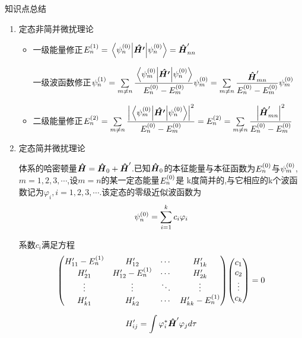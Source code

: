 \documentclass{article}
\begin{document}
        \begin{formal}
            知识点总结  
            \begin{enumerate}
                \item 定态非简并微扰理论
                \begin{itemize}
                    \item 一级能量修正$ \pe{n}{1} = \ev{\vu*{H'}}{\pp{n}{0}} = \vu*{H}'_{nn} \quad $
                    
                    一级波函数修正$ 
                    \psi_{n}^{(1)} = \sum\limits_{m \neq n} \dfrac{\mel{\psi_{m}^{(0)}}{\vu*{H'}}{\psi_{n}^{(0)}}}{E_{n}^{(0)} - E_{m}^{(0)} } \psi_{m}^{(0)} =  
                    \sum\limits_{m \neq n} \dfrac{\vu*{H}'_{mn}}{E_{n}^{(0)} - E_{m}^{(0)} } \psi_{m}^{(0)}
                    $
                    
                    \item 二级能量修正$ 
                    E_{n}^{(2)} = \sum\limits_{m \neq n} \dfrac{\abs{\mel{\psi_{m}^{(0)}}{\vu*{H'}}{\psi_{n}^{(0)}}}^{2}}{E_{n}^{(0)} - E_{m}^{(0)}} = 
                    E_{n}^{(2)} = \sum\limits_{m \neq n} \dfrac{\abs{\vu*{H}'_{mn}}^{2}}{E_{n}^{(0)} - E_{m}^{(0)}}
                    $
                \end{itemize}

                \item 定态简并微扰理论
                
                体系的哈密顿量$\vu*{H} = \vu*{H}_{0} + \vu*{H}'$.已知$\vu*{H}_{0}$的本征能量与本征函数为$E_{n}^{(0)}$与$\psi_{m}^{(0)}$,$m=1,2,3,\cdots$,设$m=n$的某一定态能量$E_{n}^{(0)}$是
                k度简并的,与它相应的k个波函数记为$\varphi_{i},i=1,2,3,\cdots$.该定态的零级近似波函数为
                $$ \psi_{n}^{(0)} = \sum\limits_{i=1}^{k} c_{i} \varphi_{i} $$           
                
                系数${c_{i}}$满足方程
                $$ 
                \mqty(H_{11}'-\pe{n}{1} & H_{12}' & \cdots & H_{1k}' \\ H_{21}' & H_{12}'- \pe{n}{1} & \cdots & H_{2k}' \\ \vdots & \vdots & \ddots & \vdots \\ H_{k1}' & H_{k2}' & \cdots & H_{kk}'- \pe{n}{1} ) 
                \mqty(c_{1} \\ c_{2} \\ \vdots \\ c_{k}) = 0 
                $$

                $$ H_{ij}' = \int \varphi_{i}^{*} \vu*{H}' \varphi_{j} d\tau $$
                

\end{enumerate}
\end{formal}
\end{document}
